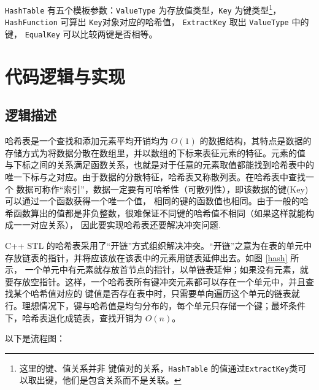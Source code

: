 {\lstinline{HashTable} 有五个模板参数：\lstinline{ValueType} 为存放值类型，\lstinline{Key} 为键类型\footnote{这里的键、值关系并非%
键值对的关系，\lstinline{HashTable} 的值通过\lstinline{ExtractKey}类可以取出键，他们是包含关系而不是关联。}，%
\lstinline{HashFunction} 可算出 \lstinline{Key}对象对应的哈希值， \lstinline{ExtractKey} 取出 \lstinline{ValueType} 中的键，%
\lstinline{EqualKey} 可以比较两键是否相等。

\section{代码逻辑与实现}

\subsection{逻辑描述}

哈希表是一个查找和添加元素平均开销均为 $O(1)$ 的数据结构，其特点是数据的存储方式为将数据分散在数组里，并以数组的下标来表征元素的特征。元素的值%
与下标之间的关系满足函数关系，也就是对于任意的元素取值都能找到哈希表中的唯一下标与之对应。由于数据的分散特征，哈希表又称{散列表}。在哈希表中查找一个%
数据可称作“索引”，数据一定要有{\kaishu 可哈希性（可散列性）}，即该数据的{\kaishu 键(Key)}可以通过一个函数获得一个唯一个值，%
相同的键的函数值也相同。由于一般的哈希函数算出的值都是非负整数，很难保证不同键的哈希值不相同（如果这样就能构成一一对应关系），%
因此要实现哈希表还要解决{\kaishu 冲突}问题.

C++ STL 的哈希表采用了“开链”方式组织解决冲突。“开链”之意为在表的单元中存放链表的指针，并将应该放在该表中的元素用链表延伸出去。如图 \ref{hash} 所示，%
一个单元中有元素就存放首节点的指针，以单链表延伸；如果没有元素，就要存放空指针。这样，一个哈希表所有键冲突元素都可以存在一个单元中，并且查找某个哈希值对应的%
键值是否存在表中时，只需要单向遍历这个单元的链表就行。理想情况下，键与哈希值是均匀分布的，每个单元只存储一个键；最坏条件下，哈希表退化成链表，查找开销为 $O(n)$。

以下是流程图：

{
    \begin{figure}[H]
        \centering
\end{figure}}}
